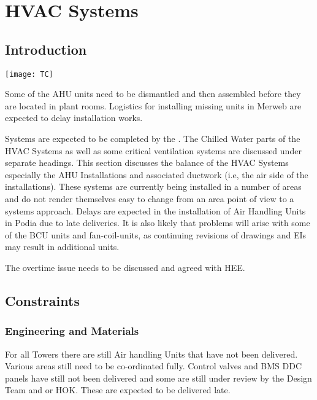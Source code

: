 \chapter{HVAC Systems}
\section{Introduction  \label{HVAC}}
\begin{marginfigure}%
  \texttt{[image: TC]}
  \caption{Some of the AHU units need to be dismantled and then assembled before they are located in plant rooms. Logistics for installing missing units in Merweb are expected to delay installation works.}
  \label{fig:marginfig1}
\end{marginfigure}
 Systems are expected to be completed by the \deadline.
The Chilled Water parts of the HVAC Systems as well as some critical ventilation systems are discussed under separate headings. This section discusses the balance of the HVAC Systems especially the AHU Installations and associated ductwork (i.e, the air side of the installations). These systems are currently being installed in a number of  areas and do not render themselves easy to change from an area point of view to a systems approach. 
Delays are expected in the installation of Air Handling Units in Podia due to late deliveries. It is also likely that problems will arise with some of the BCU units and fan-coil-units, as continuing revisions of drawings and EIs may result in additional units.

\ramadaneffect The overtime issue needs to be discussed and agreed with HEE.
\section{Constraints}
\subsection{Engineering and Materials}
For all Towers there are still Air handling Units that have not been delivered. Various areas still need to be co-ordinated fully. Control valves and BMS DDC panels have still not been delivered and some are still under review by the Design Team and or HOK. These are expected to be delivered late.


